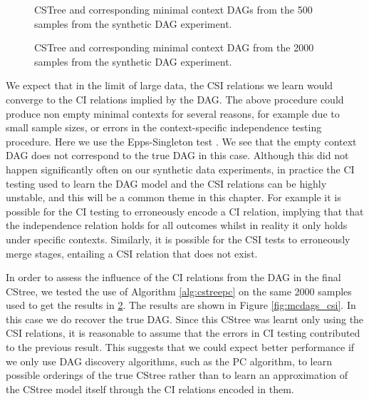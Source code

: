 \documentclass{tufte-book}
\begin{document}
\begin{figure}[!h]\label{fig:mc_dags500}
   \begin{floatrow}
%
 \caption{CSTree and corresponding minimal context DAGs from the 500 samples from the synthetic DAG experiment.}
        
   \end{floatrow}
\end{figure}


\begin{figure}[!h]\label{fig:mc_dags2000}
   \begin{floatrow}
%
 \caption{CSTree and corresponding minimal context DAG from the 2000 samples from the synthetic DAG experiment.}
        
   \end{floatrow}
\end{figure}


We expect that in the limit of large data, the CSI relations we learn would converge to the CI relations implied by the DAG. The above procedure could produce non empty minimal contexts for several reasons, for example due to small sample sizes, or errors in the context-specific independence testing procedure. Here we use the Epps-Singleton test \cite{epps-1986-omnib-test}. We see that the empty context DAG does not correspond to the true DAG in this case. Although this did not happen significantly often on our synthetic data experiments, in practice the CI testing used to learn the DAG model and the CSI relations can be highly unstable, and this will be a common theme in this chapter. For example it is possible for the CI testing to erroneously encode a CI relation, implying that that the independence relation holds for all outcomes whilst in reality it only holds under specific contexts. Similarly, it is possible for the CSI tests to erroneously merge stages, entailing a CSI relation that does not exist. 


In order to assess the influence of the CI relations from the DAG in the final CStree, we tested the use of Algorithm \ref{alg:cstreepc} on the same 2000 samples used to get the results in \ref{fig:mc_dags2000}. The results are shown in Figure \ref{fig:mcdags_csi}. In this case we do recover the true DAG. Since this CStree was learnt only using the CSI relations, it is reasonable to assume that the errors in CI testing contributed to the previous result. This suggests that we could expect better performance if we only use DAG discovery algorithms, such as the PC algorithm, to learn possible orderings of the true CStree rather than to learn an approximation of the CStree model itself through the CI relations encoded in them.
\end{document}
